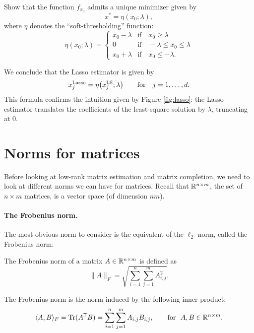 \documentclass[11pt,nocut]{article}
\begin{document}
\begin{exercise}
	Show that the function $f_{x_0}$ admits a unique minimizer given by
	$$
	x^* = \eta(x_0; \lambda),
	$$
	where $\eta$ denotes the ``soft-thresholding'' function:
	$$
	\eta(x_0;\lambda) = 
	\begin{cases}
		x_0-\lambda & \text{if} \quad x_0 \geq \lambda \\
		0 & \text{if} \quad -\lambda \leq x_0 \leq \lambda \\
		x_0 + \lambda & \text{if} \quad x_0 \leq -\lambda.
	\end{cases}
	$$
\end{exercise}
\vspace{2mm}

We conclude that the Lasso estimator is given by
$$
x^{\rm Lasso}_{j} = \eta\big(x_j^{\rm LS}; \lambda\big) \qquad \text{for} \quad j=1, \dots, d.
$$
This formula confirms the intuition given by Figure \ref{fig:lasso}: the Lasso estimator translates the coefficients of the least-square solution by $\lambda$, truncating at $0$.


\section{Norms for matrices}

Before looking at low-rank matrix estimation and matrix completion, we need to look at different norms we can have for matrices. Recall that $\mathbb{R}^{n \times m}$, the set of $n \times m$ matrices, is a vector space (of dimension $nm$).
\\

\paragraph{The Frobenius norm.} The most obvious norm to consider is the equivalent of the $\ell_2$ norm, called the Frobenius norm:
\begin{definition}
	The Frobenius norm of a matrix $A \in \mathbb{R}^{n \times m}$ is defined as
	$$
	\|A\|_F = \sqrt{\sum_{i=1}^n \sum_{j=1}^m A_{i,j}^2}. 
	$$
\end{definition}

\begin{remark}
	The Frobenius norm is the norm induced by the following inner-product:
	$$
	\langle A,B \rangle_{F} = {{\rm Tr}}(A^{{\sf T}}B) = \sum_{i=1}^n\sum_{j=1}^m A_{i,j} B_{i,j}, \qquad \text{for} \ \ A,B \in \mathbb{R}^{n \times m}.
	$$
\end{remark}
\end{document}
